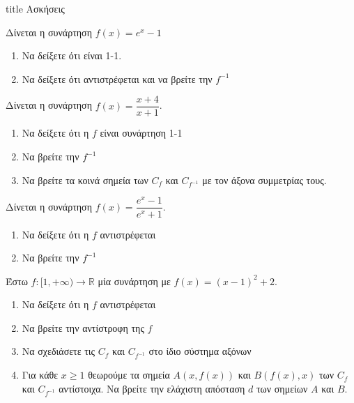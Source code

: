 \documentclass{presentation}
\begin{document}
\begin{frame}[noframenumbering]
  \vfill
  \centering
  \begin{beamercolorbox}[sep=8pt,center,shadow=true,rounded=true]{title}
    Ασκήσεις
  \end{beamercolorbox}
  \vfill
\end{frame}

\begin{askisi}
  Δίνεται η συνάρτηση $f(x)=e^x-1$
  \begin{enumerate}
    \item Να δείξετε ότι είναι 1-1. \pause
    \item Να δείξετε ότι αντιστρέφεται και να βρείτε την $f^{-1}$
  \end{enumerate}
\end{askisi}

\begin{askisi}
  Δίνεται η συνάρτηση $f(x)=\dfrac{x+4}{x+1}$.
  \begin{enumerate}
    \item Να δείξετε ότι η $f$ είναι συνάρτηση 1-1 \pause
    \item Να βρείτε την $f^{-1}$
    \item Να βρείτε τα κοινά σημεία των $C_f$ και $C_{f^{-1}}$ με τον άξονα συμμετρίας τους.
  \end{enumerate}
\end{askisi}

\begin{askisi}
  Δίνεται η συνάρτηση $f(x)=\dfrac{e^x-1}{e^x+1}$.
  \begin{enumerate}
    \item Να δείξετε ότι η $f$ αντιστρέφεται\pause
    \item Να βρείτε την $f^{-1}$
  \end{enumerate}
\end{askisi}

\begin{askisi}
  Έστω $f:[1,+\infty)\to \mathbb{R}$ μία συνάρτηση με $f(x)=(x-1)^2+2$.
  \begin{enumerate}
    \item Να δείξετε ότι η $f$ αντιστρέφεται \pause
    \item Να βρείτε την αντίστροφη της $f$ \pause
    \item Να σχεδιάσετε τις $C_f$ και $C_{f^{-1}}$ στο ίδιο σύστημα αξόνων\pause
    \item Για κάθε $x\ge 1$ θεωρούμε τα σημεία $Α(x,f(x))$ και $Β(f(x),x)$ των $C_f$ και $C_{f^{-1}}$ αντίστοιχα. Να βρείτε την ελάχιστη απόσταση $d$ των σημείων $Α$ και $Β$.
  \end{enumerate}
\end{askisi}
\end{document}
